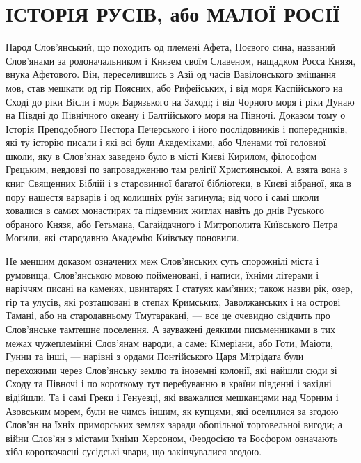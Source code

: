\section{ІСТОРІЯ РУСІВ, або МАЛОЇ РОСІЇ}

Народ Слов'янський, що походить од племені Афета, Ноєвого сина, названий
Слов'янами за родоначальником і Князем своїм Славеном, нащадком Росса Князя,
внука Афетового. Він, переселившись з Азії од часів Вавілонського змішання мов,
став мешкати од гір Поясних, або Рифейських, і від моря Каспійського на Сході
до ріки Вісли і моря Варязького на Заході; і від Чорного моря і ріки Дунаю на
Півдні до Північного океану і Балтійського моря на Півночі. Доказом тому о
Історія Преподобного Нестора Печерського і його послідовників і попередників,
які ту історію писали і які всі були Академіками, або Членами тої головної
школи, яку в Слов'янах заведено було в місті Києві Кирилом, філософом Грецьким,
невдовзі по запровадженню там релігії Християнської. А взята вона з книг
Священних Біблій і з старовинної багатої бібліотеки, в Києві зібраної, яка в
пору нашестя варварів і од колишніх руїн загинула; від чого і самі школи
ховалися в самих монастирях та підземних житлах навіть до днів Руського
обраного Князя, або Гетьмана, Сагайдачного і Митрополита Київського Петра
Могили, які стародавню Академію Київську поновили.

Не меншим доказом означених меж Слов'янських суть спорожнілі міста і румовища,
Слов'янською мовою пойменовані, і написи, їхніми літерами і наріччям писані на
каменях, цвинтарях І статуях кам'яних; також назви рік, озер, гір та улусів,
які розташовані в степах Кримських, Заволжанських і на острові Тамані, або на
стародавньому Тмутаракані, — все це очевидно свідчить про Слов'янське тамтешнє
поселення. А зауважені деякими письменниками в тих межах чужеплемінні Слов'янам
народи, а саме: Кімеріани, або Готи, Маіоти, Гунни та інші, — нарівні з ордами
Понтійського Царя Мітрідата були перехожими через Слов'янську землю та іноземні
колонії, які найшли сюди зі Сходу та Півночі і по короткому тут перебуванню в
країни південні і західні відійшли. Та і самі Греки і Генуезці, які вважалися
мешканцями над Чорним і Азовським морем, були не чимсь іншим, як купцями, які
оселилися за згодою Слов'ян на їхніх приморських землях заради обопільної
торговельної вигоди; а війни Слов'ян з містами їхніми Херсоном, Феодосією та
Босфором означають хіба короткочасні сусідські чвари, що закінчувалися згодою.

